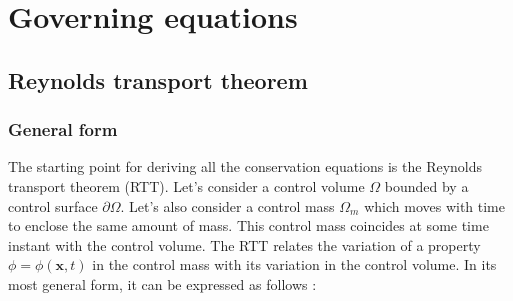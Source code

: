 


\section{Governing equations }
\label{sec:ch2_governing_equations}

\subsection{Reynolds transport theorem}

\subsubsection*{General form}

The starting point for deriving all the conservation equations is the Reynolds transport theorem (RTT). Let's consider a control volume $\Omega$ bounded by a control surface $\partial \Omega$. Let's also consider a control mass $\Omega_m$ which moves with time to enclose the same amount of mass. This control mass coincides at some time instant with the control volume. The RTT relates the variation of a property $\phi = \phi \left( \boldsymbol{x}, t \right)$ in the control mass with its variation in the control volume. In its most general form, it can be expressed as follows :

